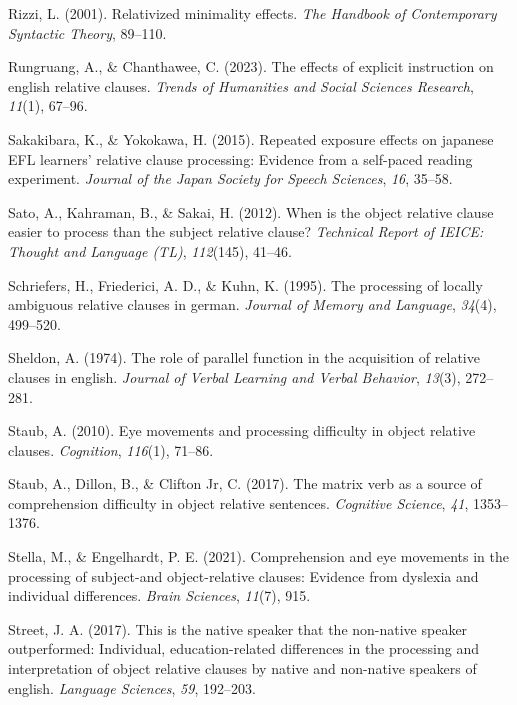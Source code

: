 \documentclass[
]{article}
\newlength{\cslhangindent}
\newenvironment{CSLReferences}[2] %
 {\begin{list}{}{%
  \setlength{\itemindent}{0pt}
  \setlength{\leftmargin}{0pt}
  \setlength{\parsep}{0pt}
  \ifodd #1
   \setlength{\leftmargin}{\cslhangindent}
   \setlength{\itemindent}{-1\cslhangindent}
  \fi
  \setlength{\itemsep}{#2\baselineskip}}}
 {\end{list}}
\begin{document}
\begin{CSLReferences}{1}{0}
Rizzi, L. (2001). Relativized minimality effects. \emph{The Handbook of
Contemporary Syntactic Theory}, 89--110.

Rungruang, A., \& Chanthawee, C. (2023). The effects of explicit
instruction on english relative clauses. \emph{Trends of Humanities and
Social Sciences Research}, \emph{11}(1), 67--96.

Sakakibara, K., \& Yokokawa, H. (2015). Repeated exposure effects on
japanese EFL learners' relative clause processing: Evidence from a
self-paced reading experiment. \emph{Journal of the Japan Society for
Speech Sciences}, \emph{16}, 35--58.

Sato, A., Kahraman, B., \& Sakai, H. (2012). When is the object relative
clause easier to process than the subject relative clause?
\emph{Technical Report of IEICE: Thought and Language (TL)},
\emph{112}(145), 41--46.

Schriefers, H., Friederici, A. D., \& Kuhn, K. (1995). The processing of
locally ambiguous relative clauses in german. \emph{Journal of Memory
and Language}, \emph{34}(4), 499--520.

Sheldon, A. (1974). The role of parallel function in the acquisition of
relative clauses in english. \emph{Journal of Verbal Learning and Verbal
Behavior}, \emph{13}(3), 272--281.

Staub, A. (2010). Eye movements and processing difficulty in object
relative clauses. \emph{Cognition}, \emph{116}(1), 71--86.

Staub, A., Dillon, B., \& Clifton Jr, C. (2017). The matrix verb as a
source of comprehension difficulty in object relative sentences.
\emph{Cognitive Science}, \emph{41}, 1353--1376.

Stella, M., \& Engelhardt, P. E. (2021). Comprehension and eye movements
in the processing of subject-and object-relative clauses: Evidence from
dyslexia and individual differences. \emph{Brain Sciences},
\emph{11}(7), 915.

Street, J. A. (2017). This is the native speaker that the non-native
speaker outperformed: Individual, education-related differences in the
processing and interpretation of object relative clauses by native and
non-native speakers of english. \emph{Language Sciences}, \emph{59},
192--203.


\end{CSLReferences}
\end{document}
